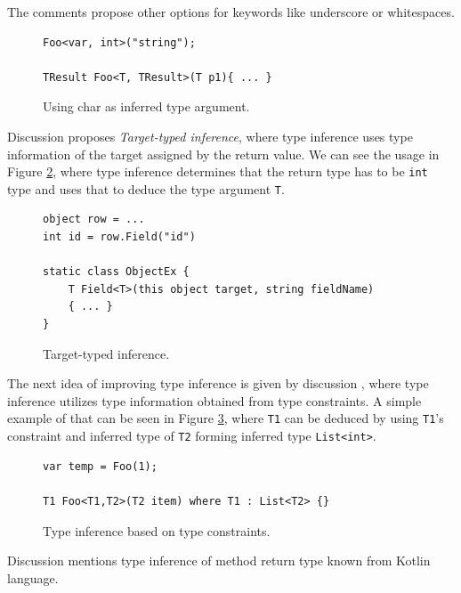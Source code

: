 The comments propose other options for keywords like underscore or whitespaces.
\par
\begin{figure}
\begin{lstlisting}[style=csharp]
Foo<var, int>("string");

TResult Foo<T, TResult>(T p1){ ... }
\end{lstlisting}
\caption{Using char as inferred type argument.}
\label{img62:CharITArg}
\end{figure}
\par
{}
Discussion \cite{online:RetTInference} proposes \textit{Target-typed inference}, where type inference uses type information of the target assigned by the return value. 
We can see the usage in Figure \ref{img62:RetTInf}, where type inference determines that the return type has to be \texttt{int} type and uses that to deduce the type argument \texttt{T}.
\par
\begin{figure}
\begin{lstlisting}[style=csharp]
object row = ...
int id = row.Field("id")

static class ObjectEx {
	T Field<T>(this object target, string fieldName) 
	{ ... }
}
\end{lstlisting}
\caption{Target-typed inference.}
\label{img62:RetTInf}
\end{figure}
\par
{}
The next idea of improving type inference is given by discussion \cite{online:TInfConst} , where type inference utilizes type information obtained from type constraints.
A simple example of that can be seen in Figure \ref{img63:TInfConst}, where \texttt{T1} can be deduced by using \texttt{T1}'s constraint and inferred type of \texttt{T2} forming inferred type \texttt{List<int>}.
\par
\begin{figure}[t]
\begin{lstlisting}[style=csharp]
var temp = Foo(1);

T1 Foo<T1,T2>(T2 item) where T1 : List<T2> {}
\end{lstlisting}
\caption{Type inference based on type constraints.}
\label{img63:TInfConst}
\end{figure}
\par
{}
Discussion \cite{online:TMRetInf} mentions type inference of method return type known from Kotlin language.
